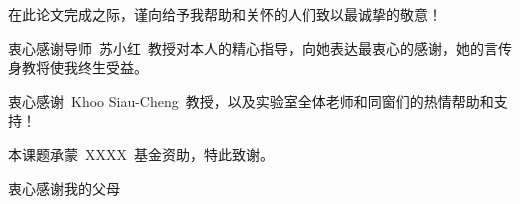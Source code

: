 

在此论文完成之际，谨向给予我帮助和关怀的人们致以最诚挚的敬意！

衷心感谢导师~苏小红~教授对本人的精心指导，向她表达最衷心的感谢，她的言传身教将使我终生受益。

衷心感谢~Khoo Siau-Cheng~教授，以及实验室全体老师和同窗们的热情帮助和支持！


本课题承蒙~XXXX~基金资助，特此致谢。

衷心感谢我的父母
